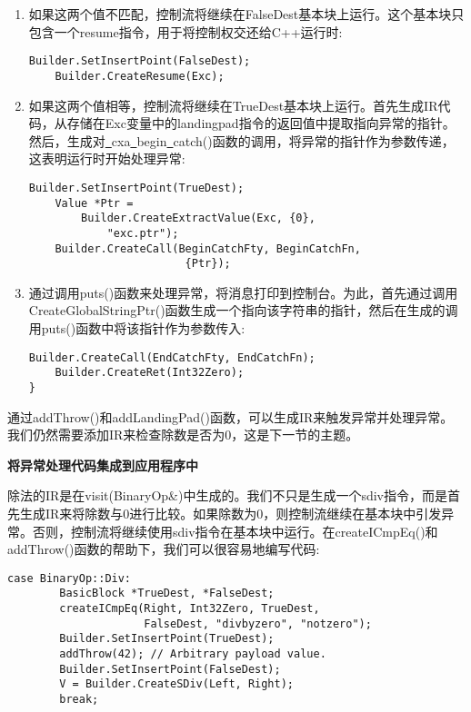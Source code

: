 \begin{enumerate}
\item 如果这两个值不匹配，控制流将继续在FalseDest基本块上运行。这个基本块只包含一个resume指令，用于将控制权交还给C++运行时:
\begin{lstlisting}[caption={}]
	Builder.SetInsertPoint(FalseDest);
	Builder.CreateResume(Exc);
\end{lstlisting}

\item 如果这两个值相等，控制流将继续在TrueDest基本块上运行。首先生成IR代码，从存储在Exc变量中的landingpad指令的返回值中提取指向异常的指针。然后，生成对\underline{~}cxa\underline{~}begin\underline{~}catch()函数的调用，将异常的指针作为参数传递，这表明运行时开始处理异常:
\begin{lstlisting}[caption={}]
	Builder.SetInsertPoint(TrueDest);
	Value *Ptr =
		Builder.CreateExtractValue(Exc, {0}, 
			"exc.ptr");
	Builder.CreateCall(BeginCatchFty, BeginCatchFn,
						{Ptr});
\end{lstlisting}

\item 通过调用puts()函数来处理异常，将消息打印到控制台。为此，首先通过调用CreateGlobalStringPtr()函数生成一个指向该字符串的指针，然后在生成的调用puts()函数中将该指针作为参数传入:
\begin{lstlisting}[caption={}]
	Builder.CreateCall(EndCatchFty, EndCatchFn);
	Builder.CreateRet(Int32Zero);
}
\end{lstlisting}
\end{enumerate}

通过addThrow()和addLandingPad()函数，可以生成IR来触发异常并处理异常。我们仍然需要添加IR来检查除数是否为0，这是下一节的主题。\par

\hspace*{\fill} \par %
\textbf{将异常处理代码集成到应用程序中}

除法的IR是在visit(BinaryOp\&)中生成的。我们不只是生成一个sdiv指令，而是首先生成IR来将除数与0进行比较。如果除数为0，则控制流继续在基本块中引发异常。否则，控制流将继续使用sdiv指令在基本块中运行。在createICmpEq()和addThrow()函数的帮助下，我们可以很容易地编写代码:\par

\begin{lstlisting}[caption={}]
	case BinaryOp::Div:
		BasicBlock *TrueDest, *FalseDest;
		createICmpEq(Right, Int32Zero, TrueDest,
					 FalseDest, "divbyzero", "notzero");
		Builder.SetInsertPoint(TrueDest);
		addThrow(42); // Arbitrary payload value.
		Builder.SetInsertPoint(FalseDest);
		V = Builder.CreateSDiv(Left, Right);
		break;
\end{lstlisting}


